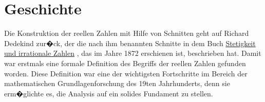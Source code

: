 \section{Geschichte}
Die Konstruktion der reellen
Zahlen mit Hilfe von Schnitten geht auf Richard Dedekind zur�ck, der die nach ihm benannten Schnitte in dem Buch
\href{http://books.google.de/books?id=n-43AAAAMAAJ&printsec=frontcover&source=gbs_ge_summary_r&cad=0#v=onepage&q&f=false}{Stetigkeit und irrationale Zahlen} 
\cite{dedekind:1872}, das im Jahre 1872 erschienen ist, beschrieben hat.  Damit war erstmals eine
formale Definition des Begriffs der reellen Zahlen gefunden worden.  Diese Definition war eine der wichtigsten
Fortschritte im Bereich der mathematischen Grundlagenforschung des 19ten Jahrhunderts, denn sie
erm�glichte es, die Analysis auf ein solides Fundament zu stellen.


